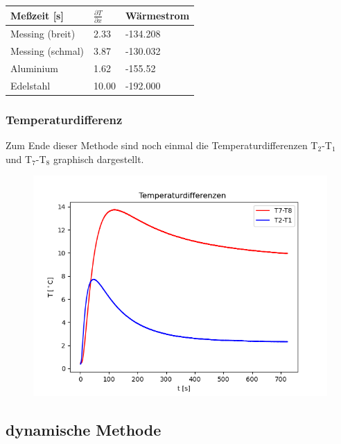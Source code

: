 \begin{minipage}{\linewidth}
    \begin{table}[H]
        \centering
    \begin{tabular}{lll}
        \toprule
        Meßzeit [s] & $\frac{\partial T}{\partial x}$ & Wärmestrom  \\
        \midrule
        Messing (breit) & 2.33 & -134.208 \\
        Messing (schmal) & 3.87 & -130.032 \\
        Aluminium & 1.62 & -155.52 \\
        Edelstahl & 10.00 & -192.000 \\
        \bottomrule   
    \end{tabular}
    
    \label{tab:5}
\end{table}
\end{minipage}

\subsubsection{Temperaturdifferenz}

Zum Ende dieser Methode sind noch einmal die Temperaturdifferenzen T$_2$-T$_1$ und T$_7$-T$_8$ graphisch dargestellt.

\begin{figure}[H]
    \centering
    \includegraphics{3.png}
\end{figure}


\subsection{dynamische Methode}

